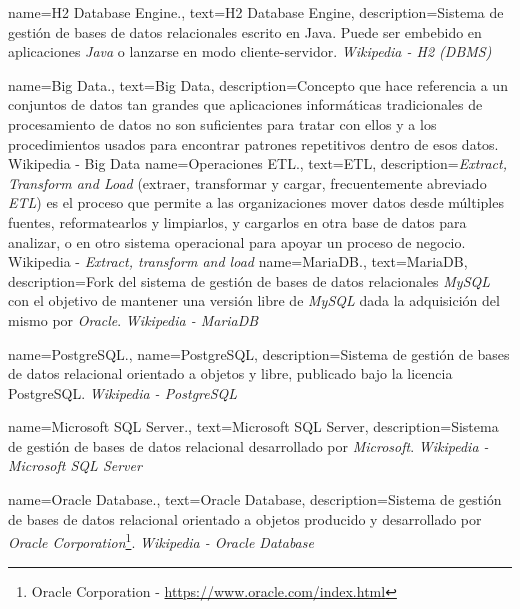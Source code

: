 {
    name={H2 Database Engine.},
    text={H2 Database Engine},
    description={Sistema de gestión de bases de datos relacionales escrito en Java. Puede ser embebido en aplicaciones \textit{Java} o lanzarse en modo cliente-servidor. \textit{Wikipedia - H2 (DBMS)} \cite{wikih2}}
}

{
    name={Big Data.},
    text={Big Data},
    description={Concepto que hace referencia a un conjuntos de datos tan grandes que aplicaciones informáticas tradicionales de procesamiento de datos no son suficientes para tratar con ellos y a los procedimientos usados para encontrar patrones repetitivos dentro de esos datos. {Wikipedia - Big Data} \cite{wikibigdata}}
}
{
    name={Operaciones ETL.},
    text={ETL},
    description={\textit{Extract, Transform and Load} (extraer, transformar y cargar, frecuentemente abreviado \textit{ETL}) es el proceso que permite a las organizaciones mover datos desde múltiples fuentes, reformatearlos y limpiarlos, y cargarlos en otra base de datos para analizar, o en otro sistema operacional para apoyar un proceso de negocio. {Wikipedia - \textit{Extract, transform and load}} \cite{wikietl}}
}
{
    name={MariaDB.},
    text={MariaDB},
    description={Fork del sistema de gestión de bases de datos relacionales \textit{MySQL} con el objetivo de mantener una versión libre de \textit{MySQL} dada la adquisición del mismo por \textit{Oracle}. \textit{Wikipedia - MariaDB} \cite{wikimariadb}}
}

{
    name={PostgreSQL.},
    name={PostgreSQL},
    description={Sistema de gestión de bases de datos relacional orientado a objetos y libre, publicado bajo la licencia PostgreSQL. \textit{Wikipedia - PostgreSQL} \cite{wikipostgresql}}
}

{
    name={Microsoft SQL Server.},
    text={Microsoft SQL Server},
    description={Sistema de gestión de bases de datos relacional desarrollado por \textit{Microsoft}. \textit{Wikipedia - Microsoft SQL Server} \cite{wikimssql}}
}

{
    name={Oracle Database.},
    text={Oracle Database},
    description={Sistema de gestión de bases de datos relacional orientado a objetos producido y desarrollado por \textit{Oracle Corporation}\footnote{Oracle Corporation - \url{https://www.oracle.com/index.html}}. \textit{Wikipedia - Oracle Database} \cite{wikioracle}}
}





